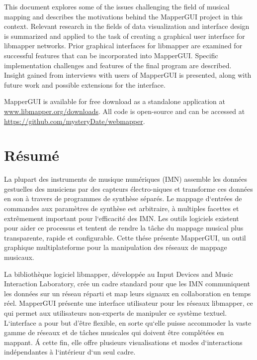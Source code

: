 \documentclass [12pt, letterpaper]{report}
\begin{document}
This document explores some of the issues challenging the field of musical mapping and describes the motivations behind the MapperGUI project in this context. Relevant research in the fields of data visualization and interface design is summarized and applied to the task of creating a graphical user interface for libmapper networks. Prior graphical interfaces for libmapper are examined for successful features that can be incorporated into MapperGUI. Specific implementation challenges and features of the final program are described. Insight gained from interviews with users of MapperGUI is presented, along with future work and possible extensions for the interface.

MapperGUI is available for free download as a standalone application at \url{www.libmapper.org/downloads}. All code is open-source and can be accessed at \url{https://github.com/mysteryDate/webmapper}.

\newpage

\section*{\centering R\'esum\'e}

La plupart des instruments de musique num\'eriques (IMN) assemble les donn\'ees gestuelles des musiciens par des capteurs \'electro-niques et transforme ces donn\'ees en son \`a travers de programmes de synth\`ese s\'epar\'es.
Le mappage d`entr\'ees de commandes aux param\`etres de synth\`ese est arbitraire, \`a multiples facettes et extr\^emement important pour l`efficacit\'e des IMN.
Les outils logiciels existent pour aider ce processus et tentent de rendre la t\^ache du mappage musical plus transparente, rapide et configurable.
Cette th\'ese pr\'esente MapperGUI, un outil graphique multiplateforme pour la manipulation des r\'eseaux de mappage musicaux.

La biblioth\`eque logiciel libmapper, d\'evelopp\'ee au Input Devices and Music Interaction Laboratory, cr\'ee un cadre standard pour que les IMN communiquent les donn\'ees sur un r\'eseau r\'eparti et map leurs signaux en collaboration en temps r\'eel.
MapperGUI pr\'esente une interface utilisateur pour les r\'eseaux libmapper, ce qui permet aux utilisateurs non-experts de manipuler ce syst\`eme textuel.
L`interface a pour but d’\^etre flexible, en sorte qu`elle puisse accommoder la vaste gamme de r\'eseaux et de t\^aches musicales qui doivent \^etre compl\'et\'ees en mappant.
\'A cette fin, elle offre plusieurs visualisations et modes d`interactions ind\'ependantes \`a l`int\'erieur d`un seul cadre.    
\end{document}
